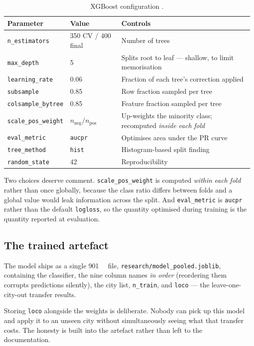 \documentclass[11pt,a4paper]{article}
\newcommand{\ttt}[1]{\texttt{#1}}
\begin{document}
\begin{table}[htbp]\centering\small
\caption{XGBoost configuration \citep{chen2016xgboost}.}\label{tab:hyper}
\begin{tabular}{@{}llp{7.0cm}@{}}
\toprule
Parameter & Value & Controls\\
\midrule
\ttt{n\_estimators} & 350 CV / 400 final & Number of trees\\
\ttt{max\_depth} & 5 & Splits root to leaf --- shallow, to limit memorisation\\
\ttt{learning\_rate} & 0.06 & Fraction of each tree's correction applied\\
\ttt{subsample} & 0.85 & Row fraction sampled per tree\\
\ttt{colsample\_bytree} & 0.85 & Feature fraction sampled per tree\\
\rowcolor{rowtint}
\ttt{scale\_pos\_weight} & $n_{\text{neg}}/n_{\text{pos}}$ & Up-weights the minority class;
  recomputed \emph{inside each fold}\\
\ttt{eval\_metric} & \ttt{aucpr} & Optimises area under the PR curve\\
\ttt{tree\_method} & \ttt{hist} & Histogram-based split finding\\
\ttt{random\_state} & 42 & Reproducibility\\
\bottomrule
\end{tabular}
\end{table}

Two choices deserve comment. \ttt{scale\_pos\_weight} is computed \emph{within each fold}
rather than once globally, because the class ratio differs between folds and a global
value would leak information across the split. And \ttt{eval\_metric} is \ttt{aucpr}
rather than the default \ttt{logloss}, so the quantity optimised during training is the
quantity reported at evaluation.

\subsection{The trained artefact}
The model ships as a single \SI{901}{\kilo\byte} file, \ttt{research/model\_pooled.joblib},
containing the classifier, the nine column names \emph{in order} (reordering them corrupts
predictions silently), the city list, \ttt{n\_train}, and \ttt{loco} --- the
leave-one-city-out transfer results.

\begin{notebox}
Storing \ttt{loco} alongside the weights is deliberate. Nobody can pick up this model and
apply it to an unseen city without simultaneously seeing what that transfer costs. The
honesty is built into the artefact rather than left to the documentation.
\end{notebox}
\end{document}
